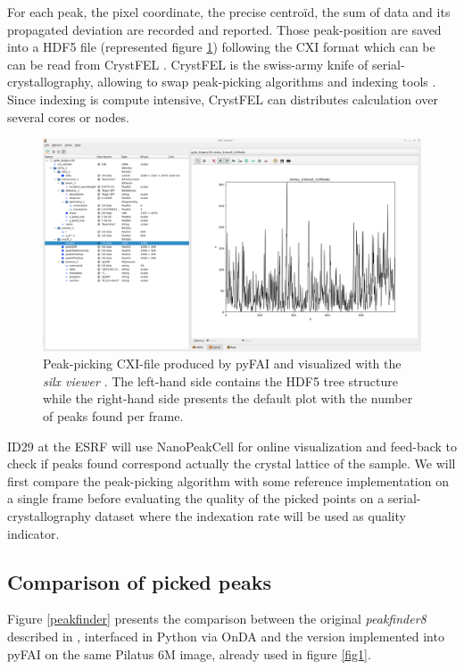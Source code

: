 \documentclass[preprint]{iucr}              %
\begin{document}
For each peak, the pixel coordinate, the precise centroïd, the sum of data and its propagated deviation are recorded and reported. 
Those peak-position are saved into a HDF5 file (represented figure \ref{silx}) following the CXI format \cite{cxi} which can be can be read from CrystFEL \cite{CrystFEL}.
CrystFEL is the swiss-army knife of serial-crystallography, allowing to swap peak-picking algorithms \cite{zaefferer, Cheetah2014, robustpeakfinder} and indexing tools \cite{xds, mosflm, taketwo, xgandalf, pinkindexer}.
Since indexing is compute intensive, CrystFEL can distributes calculation over several cores or nodes.

\begin{figure}
\label{silx}
\includegraphics[width=12cm]{silx_view}
\caption{Peak-picking CXI-file produced by pyFAI and visualized with the \textit{silx viewer} \cite{silx}.
The left-hand side contains the HDF5 tree structure while the right-hand side presents the default plot with the number of peaks found per frame.}
\end{figure}

ID29 at the ESRF will use NanoPeakCell \cite{nanopeakcell} for online visualization and feed-back to check if peaks found correspond actually the crystal lattice of the sample.
We will first compare the peak-picking algorithm with some reference implementation on a single frame before evaluating the quality of the picked points on a serial-crystallography dataset where the indexation rate will be used as quality indicator.

\subsection{Comparison of picked peaks}
Figure \ref{peakfinder} presents the comparison between the original \textit{peakfinder8} described in , interfaced in Python via OnDA \cite{onda} and the version implemented into pyFAI on the same Pilatus 6M image, already used in figure \ref{fig1}. 
\end{document}
